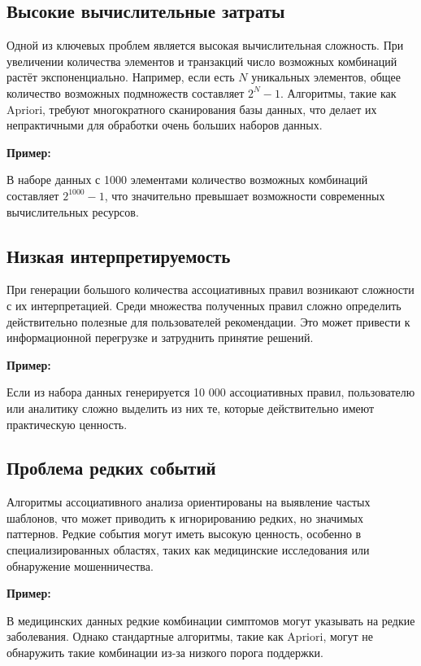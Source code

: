 \documentclass[a4paper,12pt]{article}
\begin{document}
\subsection{Высокие вычислительные затраты}

Одной из ключевых проблем является высокая вычислительная сложность. При увеличении количества элементов и транзакций число возможных комбинаций растёт экспоненциально. Например, если есть $N$ уникальных элементов, общее количество возможных подмножеств составляет $2^N - 1$. Алгоритмы, такие как Apriori, требуют многократного сканирования базы данных, что делает их непрактичными для обработки очень больших наборов данных.

\textbf{Пример:}

В наборе данных с 1000 элементами количество возможных комбинаций составляет $2^{1000} - 1$, что значительно превышает возможности современных вычислительных ресурсов.

\subsection{Низкая интерпретируемость}

При генерации большого количества ассоциативных правил возникают сложности с их интерпретацией. Среди множества полученных правил сложно определить действительно полезные для пользователей рекомендации. Это может привести к информационной перегрузке и затруднить принятие решений.

\textbf{Пример:}

Если из набора данных генерируется 10 000 ассоциативных правил, пользователю или аналитику сложно выделить из них те, которые действительно имеют практическую ценность.

\subsection{Проблема редких событий}

Алгоритмы ассоциативного анализа ориентированы на выявление частых шаблонов, что может приводить к игнорированию редких, но значимых паттернов. Редкие события могут иметь высокую ценность, особенно в специализированных областях, таких как медицинские исследования или обнаружение мошенничества.

\textbf{Пример:}

В медицинских данных редкие комбинации симптомов могут указывать на редкие заболевания. Однако стандартные алгоритмы, такие как Apriori, могут не обнаружить такие комбинации из-за низкого порога поддержки.
\end{document}
